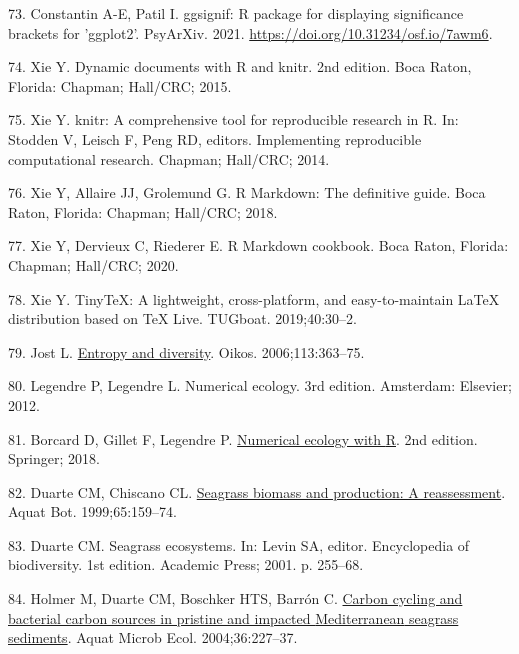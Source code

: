 \documentclass[
  12 pt,
]{article}
\newlength{\cslhangindent}
\newlength{\cslentryspacingunit} %
\newenvironment{CSLReferences}[2] %
 {%
  \setlength{\parindent}{0pt}
  \ifodd #1
  \let\oldpar\par
  \def\par{\hangindent=\cslhangindent\oldpar}
  \fi
  \setlength{\parskip}{#2\cslentryspacingunit}
 }%
 {}
\begin{document}
\begin{CSLReferences}{0}{0}
\leavevmode{}%
73. Constantin A-E, Patil I. {ggsignif}: {R} package for displaying significance brackets for {'ggplot2'}. PsyArXiv. 2021. \url{https://doi.org/10.31234/osf.io/7awm6}.

\leavevmode{}%
74. Xie Y. Dynamic documents with {R} and knitr. 2nd edition. Boca Raton, Florida: Chapman; Hall/CRC; 2015.

\leavevmode{}%
75. Xie Y. {knitr}: A comprehensive tool for reproducible research in {R}. In: Stodden V, Leisch F, Peng RD, editors. Implementing reproducible computational research. Chapman; Hall/CRC; 2014.

\leavevmode{}%
76. Xie Y, Allaire JJ, Grolemund G. R {Markdown}: The definitive guide. Boca Raton, Florida: Chapman; Hall/CRC; 2018.

\leavevmode{}%
77. Xie Y, Dervieux C, Riederer E. R {Markdown} cookbook. Boca Raton, Florida: Chapman; Hall/CRC; 2020.

\leavevmode{}%
78. Xie Y. TinyTeX: A lightweight, cross-platform, and easy-to-maintain LaTeX distribution based on {TeX Live}. TUGboat. 2019;40:30--2.

\leavevmode{}%
79. Jost L. \href{https://doi.org/10.1111/j.2006.0030-1299.14714.x}{Entropy and diversity}. Oikos. 2006;113:363--75.

\leavevmode{}%
80. Legendre P, Legendre L. Numerical ecology. 3rd edition. Amsterdam: Elsevier; 2012.

\leavevmode{}%
81. Borcard D, Gillet F, Legendre P. \href{https://doi.org/10.1007/978-3-319-71404-2}{Numerical ecology with {R}}. 2nd edition. Springer; 2018.

\leavevmode{}%
82. Duarte CM, Chiscano CL. \href{https://doi.org/10.1016/S0304-3770(99)00038-8}{Seagrass biomass and production: A reassessment}. Aquat Bot. 1999;65:159--74.

\leavevmode{}%
83. Duarte CM. Seagrass ecosystems. In: Levin SA, editor. Encyclopedia of biodiversity. 1st edition. Academic Press; 2001. p. 255--68.

\leavevmode{}%
84. Holmer M, Duarte CM, Boschker HTS, Barrón C. \href{https://doi.org/10.3354/ame036227}{Carbon cycling and bacterial carbon sources in pristine and impacted {Mediterranean} seagrass sediments}. Aquat Microb Ecol. 2004;36:227--37.


\end{CSLReferences}
\end{document}
